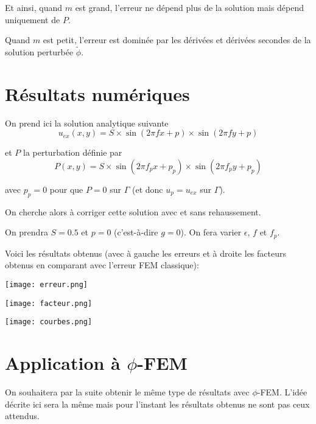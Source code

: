 Et ainsi, quand $m$ est grand, l'erreur ne dépend plus de la solution mais dépend uniquement de $P$.

Quand $m$ est petit, l'erreur est dominée par les dérivées et dérivées secondes de la solution perturbée $\tilde{\phi}$.

\section*{Résultats numériques}

On prend ici la solution analytique suivante
$$u_{ex}(x,y) = S\times\sin(2\pi fx + p)\times\sin(2\pi fy + p)$$ 

et $P$ la perturbation définie par
$$P(x,y)=S\times\sin(2\pi f_px + p_p)\times\sin(2\pi f_py + p_p)$$

avec $p_p=0$ pour que $P=0$ sur $\Gamma$ (et donc $u_p=u_{ex}$ sur $\Gamma$). 

On cherche alors à corriger cette solution avec et sans rehaussement.

On prendra $S=0.5$ et $p=0$ (c'est-à-dire $g=0$). On fera varier $\epsilon$, $f$ et $f_p$. 

\newpage

Voici les résultats obtenus (avec à gauche les erreurs et à droite les facteurs obtenus en comparant avec l'erreur FEM classique):

\begin{minipage}{0.48\linewidth}
	\centering
	\texttt{[image: erreur.png]}
\end{minipage}
\begin{minipage}{0.48\linewidth}
	\centering
	\texttt{[image: facteur.png]}
\end{minipage}

\begin{minipage}{\linewidth}
	\centering
	\texttt{[image: courbes.png]}
\end{minipage}

\section*{Application à $\phi$-FEM}

On souhaitera par la suite obtenir le même type de résultats avec $\phi$-FEM. L'idée décrite ici sera la même mais pour l'instant les résultats obtenus ne sont pas ceux attendus.